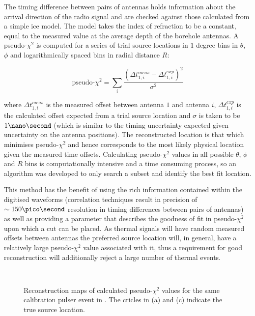 The timing difference between pairs of antennas holds information about the arrival direction of the radio signal and are checked against those calculated from a simple ice model. The model takes the index of refraction to be a constant, equal to the measured value at the average depth of the borehole antennas. A pseudo-$\chi^{2}$ is computed for a series of trial source locations in 1 degree bins in $\theta$, $\phi$ and logarithmically spaced bins in radial distance $R$:

\begin{equation}
  \mbox{pseudo-}\chi^{2} = \sum_{i} \frac{(\Delta t_{1,i}^{meas} - \Delta t_{1,i}^{exp})^{2}}{\sigma^{2}}
  \label{eq:analysis:Reconstruction:ChiSq}
\end{equation}


\noindent  where $\Delta t_{1,i}^{meas}$ is the measured offset between antenna $1$ and antenna $i$, $\Delta t_{1,i}^{exp}$ is the calculated offset expected from a trial source location and $\sigma$ is taken to be $1 \nano \second$ (which is similar to the timing uncertainty expected given uncertainty on the antenna positions). The reconstructed location is that which minimises pseudo-$\chi^{2}$ and hence corresponds to the most likely physical location given the measured time offsets. Calculating pseudo-$\chi^{2}$ values in all possible $\theta$, $\phi$ and $R$ bins is computationally intensive and a time consuming process, so an algorithm was developed to only search a subset and identify the best fit location.


 This method has the benefit of using the rich information contained within the digitised waveforms (correlation techniques result in precision of $\sim 150 \pico \second$ resolution in timing differences between pairs of antennas) as well as providing a parameter that describes the goodness of fit in pseudo-$\chi^2$ upon which a cut can be placed. As thermal signals will have random measured offsets between antennas the preferred source location will, in general, have a relatively large pseudo-$\chi^2$ value associated with it, thus a requirement for good reconstruction will additionally reject a large number of thermal events.

\begin{figure}[htpb]
  \hfill
  \\
  \caption{Reconstruction maps of calculated pseudo-$\chi^{2}$ values for the same calibration pulser event in . The cricles in (a) and (c) indicate the true source location.}
  \label{fig:analysis:Reconstruction:CSW-ChiSq-Example}
\end{figure}

